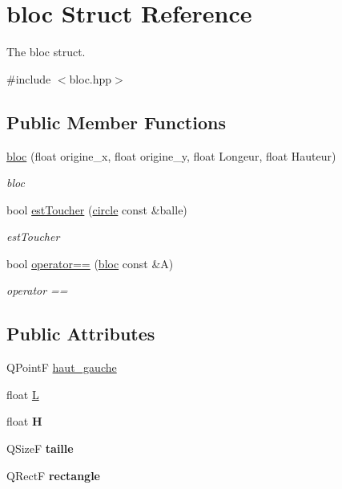 \hypertarget{structbloc}{\section{bloc Struct Reference}
\label{structbloc}
}


The bloc struct.  




{\ttfamily \#include $<$bloc.\-hpp$>$}

\subsection*{Public Member Functions}
\begin{DoxyCompactItemize}
\item 
\hyperlink{structbloc_a022f138ba1573e51ea489e9d2d9343af}{bloc} (float origine\-\_\-x, float origine\-\_\-y, float Longeur, float Hauteur)
\begin{DoxyCompactList}\small\item\em bloc \end{DoxyCompactList}\item 
bool \hyperlink{structbloc_a51aa6ddde5ddfec73ab1ac6004a1e09c}{est\-Toucher} (\hyperlink{structcircle}{circle} const \&balle)
\begin{DoxyCompactList}\small\item\em est\-Toucher \end{DoxyCompactList}\item 
bool \hyperlink{structbloc_a731b8b1d5fe6c1cf9e0edcc5c5cccc1b}{operator==} (\hyperlink{structbloc}{bloc} const \&A)
\begin{DoxyCompactList}\small\item\em operator == \end{DoxyCompactList}\end{DoxyCompactItemize}
\subsection*{Public Attributes}
\begin{DoxyCompactItemize}
\item 
Q\-Point\-F \hyperlink{structbloc_a2fc10cb754a223b8b3d5bc73cddc7696}{haut\-\_\-gauche}
\item 
float \hyperlink{structbloc_a952b25540dde128110d4c1046656cb5e}{L}
\item 
\hypertarget{structbloc_a59981ef09d24dcf015f480c3e4318eef}{float {\bfseries H}}\label{structbloc_a59981ef09d24dcf015f480c3e4318eef}

\item 
\hypertarget{structbloc_a5544a11010c7abf27df801f7b7551072}{Q\-Size\-F {\bfseries taille}}\label{structbloc_a5544a11010c7abf27df801f7b7551072}

\item 
\hypertarget{structbloc_aca18e24edbaf1c79d5d04986afb7e3e8}{Q\-Rect\-F {\bfseries rectangle}}\label{structbloc_aca18e24edbaf1c79d5d04986afb7e3e8}

\end{DoxyCompactItemize}


